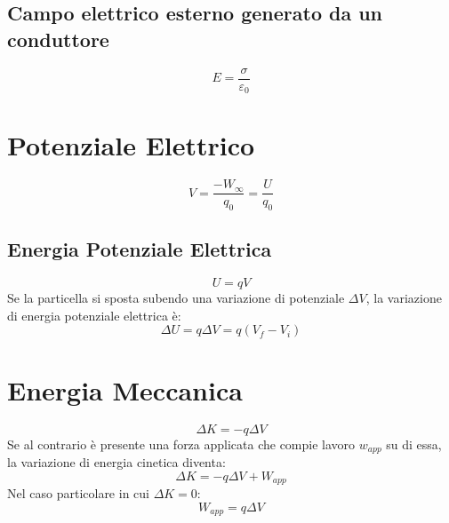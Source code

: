            \subsection*{Campo elettrico esterno generato da un conduttore}
                \begin{equation*}
                    E = \frac{\sigma}{\varepsilon_0}
                \end{equation*}

        \section*{Potenziale Elettrico}
            \begin{equation*}
                V = \frac{-W_\infty}{q_0} = \frac{U}{q_0}
            \end{equation*}

            \subsection*{Energia Potenziale Elettrica}
                \begin{equation*}
                    U = qV
                \end{equation*}
            Se la particella si sposta subendo una variazione di potenziale 
            $\Delta V$, la variazione di energia potenziale elettrica è:
                \begin{equation*}
                    \Delta U = q \Delta V = q (V_f - V_i)
                \end{equation*}
            
        \section*{Energia Meccanica}
            \begin{equation*}
                \Delta K = -q \Delta V
            \end{equation*}
        Se al contrario è presente una forza applicata che compie lavoro 
        $w_{app}$ su di essa, la variazione di energia cinetica diventa:
            \begin{equation*}
                \Delta K = -q\Delta V + W_{app}
            \end{equation*}
        Nel caso particolare in cui $\Delta K = 0$:
            \begin{equation*}
                W_{app} = q \Delta V
            \end{equation*}

